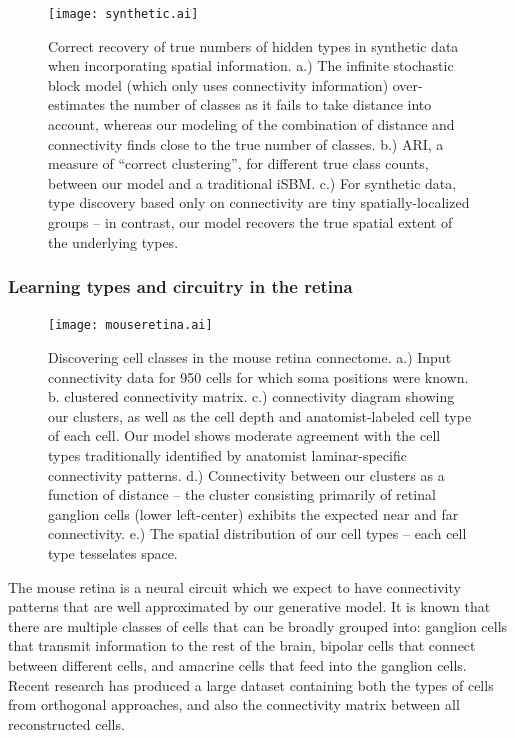 \documentclass{article}
\begin{document}
\begin{figure}
  \centering 
  \centerline{\texttt{[image: synthetic.ai]}}
  \caption{Correct recovery of true numbers of hidden types in
    synthetic data when incorporating spatial information. a.) The
    infinite stochastic block model (which only uses connectivity
    information) over-estimates the number of classes as it fails to
    take distance into account, whereas our modeling of the
    combination of distance and connectivity finds close to the true
    number of classes. b.) ARI, a measure of ``correct clustering'',
    for different true class counts, between our model and a
    traditional iSBM. c.) For synthetic data, type discovery based
    only on connectivity are tiny spatially-localized groups -- in
    contrast, our model recovers the true spatial extent of the
    underlying types.  }
\label{fig:synthetic}
\end{figure}

\subsubsection*{Learning types and circuitry in the retina}

\begin{figure}
  \centering 
  \centerline{\texttt{[image: mouseretina.ai]}}
  \caption{Discovering cell classes in the mouse retina connectome.
    a.) Input connectivity data for 950 cells for which soma positions
    were known. b. clustered connectivity matrix. c.) connectivity
    diagram showing our clusters, as well as the cell depth and
    anatomist-labeled cell type of each cell. Our model shows moderate
    agreement with the cell types traditionally identified by
    anatomist laminar-specific connectivity patterns. 
    d.) Connectivity between our clusters as a function
    of distance -- the cluster consisting primarily of retinal
    ganglion cells (lower left-center) exhibits the expected near and
    far connectivity. e.)  The spatial distribution of our cell types
    -- each cell type tesselates space.}
\label{fig:mouseretina}
\end{figure}

The mouse retina \autocite{Masland2001} is a neural circuit which we
expect to have connectivity patterns that are well approximated by our
generative model. It is known that there are multiple classes of cells
that can be broadly grouped into: ganglion cells that transmit
information to the rest of the brain, bipolar cells that connect
between different cells, and amacrine cells that feed into the
ganglion cells. Recent research \autocite{Helmstaedter2013} has
produced a large dataset containing both the types of cells from
orthogonal approaches, and also the connectivity matrix between all
reconstructed cells.
\end{document}
